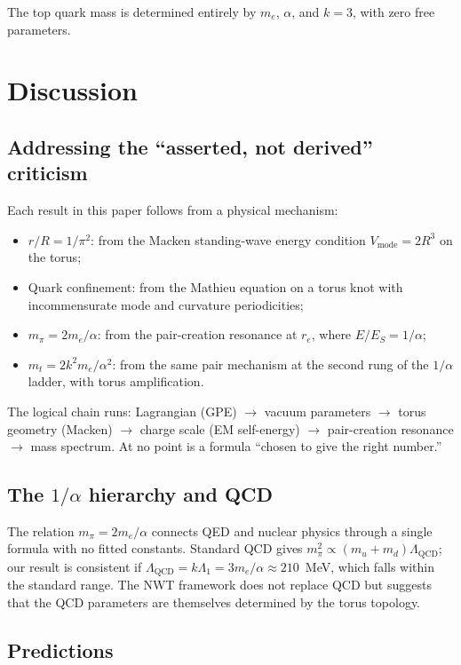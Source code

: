 \documentclass[11pt,a4paper]{article}
\begin{document}
The top quark mass is determined entirely by $m_e$, $\alpha$, and
$k = 3$, with zero free parameters.


\section{Discussion}
\label{sec:discussion}

\subsection{Addressing the ``asserted, not derived'' criticism}

Each result in this paper follows from a physical mechanism:
\begin{itemize}
\item $r/R = 1/\pi^2$: from the Macken standing-wave energy condition
  $V_{\text{mode}} = 2R^3$ on the torus;
\item Quark confinement: from the Mathieu equation on a torus knot
  with incommensurate mode and curvature periodicities;
\item $m_\pi = 2m_e/\alpha$: from the pair-creation resonance at
  $r_e$, where $E/E_S = 1/\alpha$;
\item $m_t = 2k^2 m_e/\alpha^2$: from the same pair mechanism at
  the second rung of the $1/\alpha$ ladder, with torus amplification.
\end{itemize}

The logical chain runs: Lagrangian (GPE) $\to$ vacuum parameters $\to$
torus geometry (Macken) $\to$ charge scale (EM self-energy) $\to$
pair-creation resonance $\to$ mass spectrum.  At no point is a formula
``chosen to give the right number.''

\subsection{The $1/\alpha$ hierarchy and QCD}

The relation $m_\pi = 2m_e/\alpha$ connects QED and nuclear physics
through a single formula with no fitted constants.  Standard QCD
gives $m_\pi^2 \propto (m_u + m_d)\Lambda_{\text{QCD}}$; our result
is consistent if $\Lambda_{\text{QCD}} = k\Lambda_1 = 3m_e/\alpha
\approx 210$~MeV, which falls within the standard range.  The NWT
framework does not replace QCD but suggests that the QCD parameters
are themselves determined by the torus topology.

\subsection{Predictions}
\end{document}
